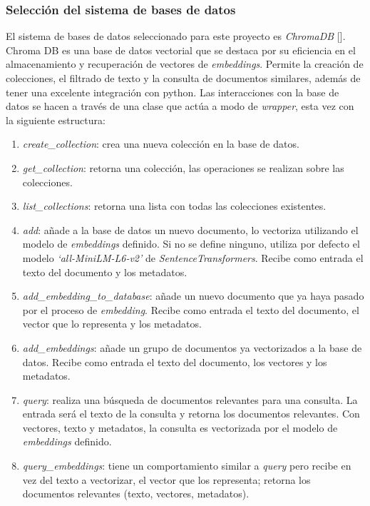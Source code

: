         \subsubsection{Selección del sistema de bases de datos}
            El sistema de bases de datos seleccionado para este proyecto es \emph{ChromaDB} [\cite{chromadb}]. Chroma DB es una base de datos vectorial que se destaca por su eficiencia en el almacenamiento y recuperación de vectores de \emph{embeddings}. Permite la creación de colecciones, el filtrado de texto y la consulta de documentos similares, además de tener una excelente integración con python.
        Las interacciones con la base de datos se hacen a través de una clase que actúa a modo de \emph{wrapper}, esta vez con la siguiente estructura:
        \begin{enumerate}
            \item \emph{create\_collection}: crea una nueva colección en la base de datos.
            \item \emph{get\_collection}: retorna una colección, las operaciones se realizan sobre las colecciones.
            \item \emph{list\_collections}: retorna una lista con todas las colecciones existentes.
            \item \emph{add}: añade a la base de datos un nuevo documento, lo vectoriza utilizando el modelo de \emph{embeddings} definido. Si no se define ninguno, utiliza por defecto el modelo \emph{`all-MiniLM-L6-v2'} de \emph{SentenceTransformers}. Recibe como entrada el texto del documento y los metadatos.
            \item \emph{add\_embedding\_to\_database}: añade un nuevo documento que ya haya pasado por el proceso de \emph{embedding}. Recibe como entrada el texto del documento, el vector que lo representa y los metadatos.
            \item \emph{add\_embeddings}: añade un grupo de documentos ya vectorizados a la base de datos. Recibe como entrada el texto del documento, los vectores y los metadatos. 
            \item \emph{query}: realiza una búsqueda de documentos relevantes para una consulta. La entrada será el texto  de la consulta y retorna los documentos relevantes. Con vectores, texto y metadatos, la consulta es vectorizada por el modelo de \emph{embeddings} definido.
            \item \emph{query\_embeddings}: tiene un comportamiento similar a \emph{query} pero recibe en vez del texto a vectorizar, el vector que los representa; retorna los documentos relevantes (texto, vectores, metadatos).
        \end{enumerate}

